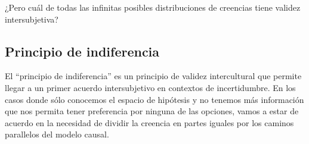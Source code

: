 \documentclass[a4paper,10pt]{book}
\theoremstyle{definition}
\begin{document}

¿Pero cu\'al de todas las infinitas posibles distribuciones de creencias tiene validez intersubjetiva?

\subsection{Principio de indiferencia}\label{sec:principio_indiferencia}

El ``principio de indiferencia'' es un principio de validez intercultural que permite llegar a un primer acuerdo intersubjetivo en contextos de incertidumbre.
%
En los casos donde s\'olo conocemos el espacio de hip\'otesis y no tenemos m\'as informaci\'on que nos permita tener preferencia por ninguna de las opciones, vamos a estar de acuerdo en la necesidad de dividir la creencia en partes iguales por los caminos parallelos del modelo causal.
%
\end{document}
